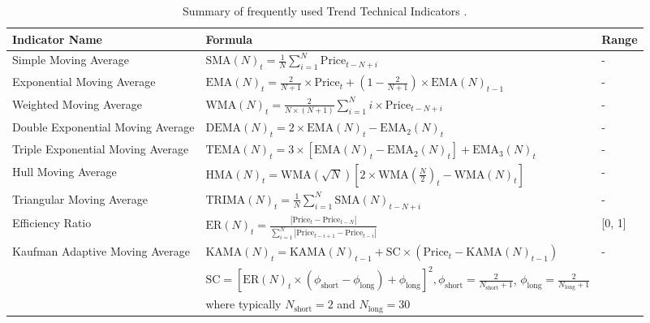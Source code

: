 \begin{table}[htb!]
\centering
\footnotesize
\begin{tabularx}{\textwidth}{@{}lXl@{}}
\toprule
\textbf{Indicator Name} & \textbf{Formula} & \textbf{Range} \\
\midrule
Simple Moving Average & $\text{SMA}(N)_t = \frac{1}{N} \sum_{i=1}^{N} \text{Price}_{t-N+i}$ & - \\
\addlinespace
Exponential Moving Average & $\text{EMA}(N)_t = \frac{2}{N+1} \times \text{Price}_t + (1 - \frac{2}{N+1}) \times \text{EMA}(N)_{t-1}$ & - \\
\addlinespace
Weighted Moving Average & $\text{WMA}(N)_t = \frac{2}{N \times (N + 1)} \sum_{i=1}^{N} i \times \text{Price}_{t-N+i}$ & - \\
\addlinespace
Double Exponential Moving Average & $\text{DEMA}(N)_t = 2 \times \text{EMA}(N)_t - \text{EMA}_2(N)_t$ & - \\
\addlinespace
Triple Exponential Moving Average & $\text{TEMA}(N)_t = 3 \times [\text{EMA}(N)_t - \text{EMA}_2(N)_t] + \text{EMA}_3(N)_t$ & - \\
\addlinespace
Hull Moving Average & $\text{HMA}(N)_t = \text{WMA}\left(\sqrt{N}\right)\left[2 \times \text{WMA}\left(\frac{N}{2}\right)_t - \text{WMA}(N)_t\right]$ & - \\
\addlinespace
Triangular Moving Average & $\text{TRIMA}(N)_t = \frac{1}{N} \sum_{i=1}^{N} \text{SMA}(N)_{t-N+i}$ & - \\
\addlinespace
Efficiency Ratio & $\text{ER}(N)_t = \frac{| \text{Price}_t - \text{Price}_{t-N} |}{\sum_{i=1}^{N} | \text{Price}_{t-i+1} - \text{Price}_{t-i} |}$ & [0, 1] \\
\addlinespace
Kaufman Adaptive Moving Average & $\text{KAMA}(N)_t = \text{KAMA}(N)_{t-1} + \text{SC} \times (\text{Price}_t - \text{KAMA}(N)_{t-1})$ & - \\
\addlinespace
& $\text{SC} = [ \text{ER}(N)_t \times (\phi_{\text{short}} - \phi_{\text{long}}) + \phi_{\text{long}} ]^2, \phi_{\text{short}} = \frac{2}{N_{\text{short}} + 1}$, $\phi_{\text{long}} = \frac{2}{N_{\text{long}} + 1}$ & \\
\addlinespace
& where typically $N_{\text{short}} = 2$ and $N_{\text{long}} = 30$ & \\
\bottomrule
\end{tabularx}
\caption{Summary of frequently used Trend Technical Indicators \cite{jansen_machine_2020}.}
\label{Tables:TrendIndicators}
\end{table}
